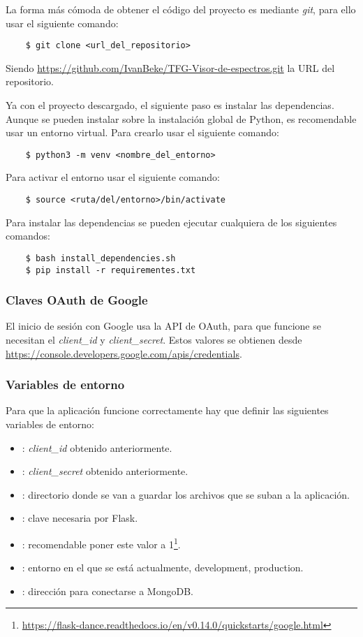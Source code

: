 La forma más cómoda de obtener el código del proyecto es mediante \textit{git}, 
para ello usar el siguiente comando:
\begin{lstlisting}
	$ git clone <url_del_repositorio>
\end{lstlisting}
Siendo \url{https://github.com/IvanBeke/TFG-Visor-de-espectros.git} la URL del 
repositorio.

Ya con el proyecto descargado, el siguiente paso es instalar las dependencias. 
Aunque se pueden instalar sobre la instalación global de Python, es 
recomendable usar un entorno virtual. Para crearlo usar el siguiente comando:
\begin{lstlisting}
	$ python3 -m venv <nombre_del_entorno>
\end{lstlisting}
Para activar el entorno usar el siguiente comando:
\begin{lstlisting}
	$ source <ruta/del/entorno>/bin/activate
\end{lstlisting}
Para instalar las dependencias se pueden ejecutar cualquiera de los siguientes 
comandos:
\begin{lstlisting}
	$ bash install_dependencies.sh
	$ pip install -r requirementes.txt
\end{lstlisting}

\subsubsection{Claves OAuth de Google}

El inicio de sesión con Google usa la API de OAuth, para que funcione se 
necesitan el \textit{client\_id} y \textit{client\_secret}. Estos valores se 
obtienen desde \url{https://console.developers.google.com/apis/credentials}.

\subsubsection{Variables de entorno}

Para que la aplicación funcione correctamente hay que definir las siguientes 
variables de entorno:
\begin{itemize}
	\item {}: \textit{client\_id} obtenido 
	anteriormente.
	\item {}: \textit{client\_secret} 
	obtenido anteriormente.
	\item {}: directorio donde se van a guardar los archivos 
	que se suban a la aplicación.
	\item {}: clave necesaria por Flask.
	\item {}: recomendable poner este valor a 
	1\footnote{\url{https://flask-dance.readthedocs.io/en/v0.14.0/quickstarts/google.html}}.
	\item {}: entorno en el que se está actualmente, 
	development, production.
	\item {}: dirección para conectarse a MongoDB.
\end{itemize}

